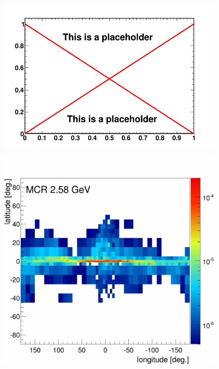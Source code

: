 \begin{figure}[h]
  \centering
  \begin{minipage}[h]{0.45\textwidth}
  	\centering
	\includegraphics[width=1.\linewidth]{pic/dummy.png}
  	\label{fig:CO_skymap}
  \end{minipage}
  \hfill
  \begin{minipage}[h]{0.45\textwidth}
  	\centering
	\includegraphics[width=1.\linewidth]{pic/results/MCRonly_MCR_fluxE12_skymap.png}
  	\label{fig:MCRonly_skymap_MCR}

\end{minipage}
\end{figure}
